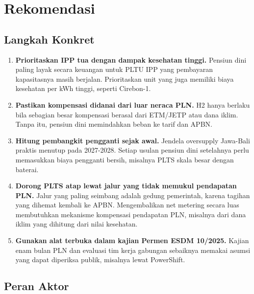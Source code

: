 \section{Rekomendasi}
\label{sec:rekomendasi}

\subsection{Langkah Konkret}

\begin{enumerate}
  \item \textbf{Prioritaskan IPP tua dengan dampak kesehatan tinggi.} Pensiun dini paling layak secara keuangan untuk PLTU IPP yang pembayaran kapasitasnya masih berjalan. Prioritaskan unit yang juga memiliki biaya kesehatan per kWh tinggi, seperti Cirebon-1.
  \item \textbf{Pastikan kompensasi didanai dari luar neraca PLN.} H2 hanya berlaku bila sebagian besar kompensasi berasal dari ETM/JETP atau dana iklim. Tanpa itu, pensiun dini memindahkan beban ke tarif dan APBN.
  \item \textbf{Hitung pembangkit pengganti sejak awal.} Jendela oversupply Jawa-Bali praktis menutup pada 2027-2028. Setiap usulan pensiun dini setelahnya perlu memasukkan biaya pengganti bersih, misalnya PLTS skala besar dengan baterai.
  \item \textbf{Dorong PLTS atap lewat jalur yang tidak memukul pendapatan PLN.} Jalur yang paling seimbang adalah gedung pemerintah, karena tagihan yang dihemat kembali ke APBN. Mengembalikan net metering secara luas membutuhkan mekanisme kompensasi pendapatan PLN, misalnya dari dana iklim yang dihitung dari nilai kesehatan.
  \item \textbf{Gunakan alat terbuka dalam kajian Permen ESDM 10/2025.} Kajian enam bulan PLN dan evaluasi tim kerja gabungan sebaiknya memakai asumsi yang dapat diperiksa publik, misalnya lewat PowerShift.
\end{enumerate}

\subsection{Peran Aktor}

